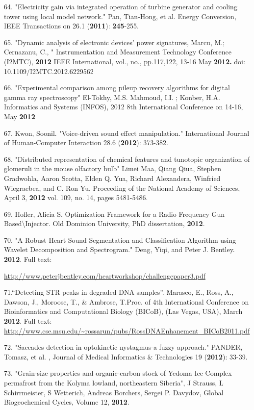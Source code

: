 64. "Electricity gain via integrated operation of turbine generator and cooling tower using local model network." Pan, Tian-Hong, et al. Energy Conversion, IEEE Transactions on 26.1 (\textbf{2011}): \textbf{245}-255.

65. "Dynamic analysis of electronic devices' power signatures, Marcu, M.; Cernazanu, C., " Instrumentation and Measurement Technology Conference (I2MTC), \textbf{2012} IEEE International, vol., no., pp.117,122, 13-16 May \textbf{2012.} doi: 10.1109/I2MTC.2012.6229562

66. "Experimental comparison among pileup recovery algorithms for digital gamma ray spectroscopy" El-Tokhy, M.S. Mahmoud, I.I. ; Konber, H.A. Informatics and Systems (INFOS), 2012 8th International Conference on 14-16, May \textbf{2012}

67. Kwon, Soonil. "Voice-driven sound effect manipulation." International Journal of Human-Computer Interaction 28.6 (\textbf{2012}): 373-382.

68. "Distributed representation of chemical features and tunotopic organization of glomeruli in the mouse olfactory bulb" Limei Maa, Qiang Qiua, Stephen Gradwohla, Aaron Scotta, Elden Q. Yua, Richard Alexandera, Winfried Wiegraebea, and C. Ron Yu, Proceeding of the National Academy of Sciences, April 3, \textbf{2012} vol. 109, no. 14, pages 5481-5486.

69. Hofler, Alicia S. Optimization Framework for a Radio Frequency Gun Based\textbackslash  Injector. Old Dominion University, PhD dissertation, \textbf{2012}.

70. "A Robust Heart Sound Segmentation and Classification Algorithm using Wavelet Decomposition and Spectrogram." Deng, Yiqi, and Peter J. Bentley. \textbf{2012}. Full text:

\url{http://www.peterjbentley.com/heartworkshop/challengepaper3.pdf}

71.``Detecting STR peaks in degraded DNA samples''. Marasco, E., Ross, A., Dawson, J., Moroose, T., \& Ambrose, T.Proc. of 4th International Conference on Bioinformatics and Computational Biology (BICoB), (Las Vegas, USA), March \textbf{2012}. Full text: \url{http://www.cse.msu.edu/~rossarun/pubs/RossDNAEnhanement_BICoB2011.pdf}

72. "Saccades detection in optokinetic nystagmus-a fuzzy approach." PANDER, Tomasz, et al. , Journal of Medical Informatics \& Technologies 19 (\textbf{2012}): 33-39.

73. "Grain-size properties and organic-carbon stock of Yedoma Ice Complex permafrost from the Kolyma lowland, northeastern Siberia", J Strauss, L Schirrmeister, S Wetterich, Andreas Borchers, Sergei P. Davydov, Global Biogeochemical Cycles, Volume 12, \textbf{2012}.

